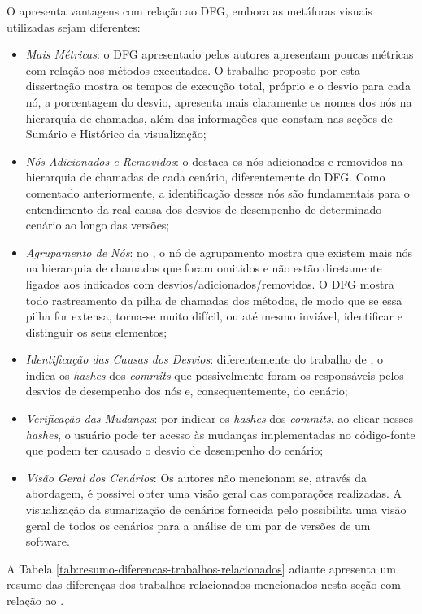 O {\textit{\toolName}} apresenta vantagens com relação ao DFG, embora as metáforas visuais utilizadas sejam diferentes:
\begin{itemize}
   \item \textit{Mais Métricas}: o DFG apresentado pelos autores apresentam poucas métricas com relação aos métodos executados. O trabalho proposto por esta dissertação mostra os tempos de execução total, próprio e o desvio para cada nó, a porcentagem do desvio, apresenta mais claramente os nomes dos nós na hierarquia de chamadas, além das informações que constam nas seções de Sumário e Histórico da visualização;
   \item \textit{Nós Adicionados e Removidos}: o {\textit{\toolName}} destaca os nós adicionados e removidos na hierarquia de chamadas de cada cenário, diferentemente do DFG. Como comentado anteriormente, a identificação desses nós são fundamentais para o entendimento da real causa dos desvios de desempenho de determinado cenário ao longo das versões;
   \item \textit{Agrupamento de Nós}: no {\textit{\toolName}}, o nó de agrupamento mostra que existem mais nós na hierarquia de chamadas que foram omitidos e não estão diretamente ligados aos indicados com desvios/adicionados/removidos. O DFG mostra todo rastreamento da pilha de chamadas dos métodos, de modo que se essa pilha for extensa, torna-se muito difícil, ou até mesmo inviável, identificar e distinguir os seus elementos;
   \item \textit{Identificação das Causas dos Desvios}: diferentemente do trabalho de \citeauthor{Bezemer2015}, o {\textit{\toolName}} indica os \textit{hashes} dos \textit{commits} que possivelmente foram os responsáveis pelos desvios de desempenho dos nós e, consequentemente, do cenário;
   \item \textit{Verificação das Mudanças}: por indicar os \textit{hashes} dos \textit{commits}, ao clicar nesses \textit{hashes}, o usuário pode ter acesso às mudanças implementadas no código-fonte que podem ter causado o desvio de desempenho do cenário;
   \item \textit{Visão Geral dos Cenários}: Os autores não mencionam se, através da abordagem, é possível obter uma visão geral das comparações realizadas. A visualização da sumarização de cenários fornecida pelo {\textit{\toolName}} possibilita uma visão geral de todos os cenários para a análise de um par de versões de um software.
\end{itemize}

A Tabela \ref{tab:resumo-diferencas-trabalhos-relacionados} adiante apresenta um resumo das diferenças dos trabalhos relacionados mencionados nesta seção com relação ao \textit{\toolName}.

